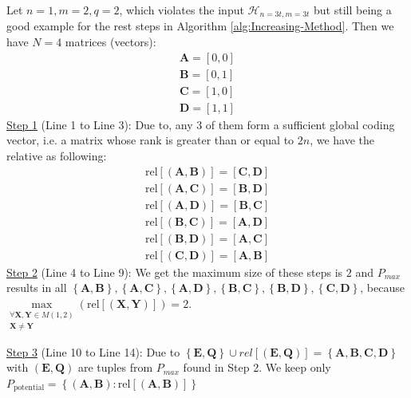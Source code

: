 \begin{example}
Let $n=1,m=2,q=2$, which violates the input $\mathcal{H}_{n=3t,m=3t}$
but still being a good example for the rest steps in Algorithm \ref{alg:Increasing-Method}.
Then we have $N=4$ matrices (vectors):
\[
\begin{array}{c}
\boldsymbol{A}=[0,0]\\
\boldsymbol{B}=[0,1]\\
\boldsymbol{C}=[1,0]\\
\boldsymbol{D}=[1,1]
\end{array}
\]
\uline{Step 1} (Line 1 to Line 3): Due to, any 3 of them form a
sufficient global coding vector, i.e. a matrix whose rank is greater
than or equal to $2n$, we have the relative as following:
\[
\begin{array}{c}
\mathrm{rel}\left[\left(\boldsymbol{A},\boldsymbol{B}\right)\right]=[\boldsymbol{C},\boldsymbol{D}]\\
\mathrm{rel}\left[\left(\boldsymbol{A},\boldsymbol{C}\right)\right]=[\boldsymbol{B},\boldsymbol{D}]\\
\mathrm{rel}\left[\left(\boldsymbol{A},\boldsymbol{D}\right)\right]=[\boldsymbol{B},\boldsymbol{C}]\\
\mathrm{rel}\left[\left(\boldsymbol{B},\boldsymbol{C}\right)\right]=[\boldsymbol{A},\boldsymbol{D}]\\
\mathrm{rel}\left[\left(\boldsymbol{B},\boldsymbol{D}\right)\right]=[\boldsymbol{A},\boldsymbol{C}]\\
\mathrm{rel}\left[\left(\boldsymbol{C},\boldsymbol{D}\right)\right]=[\boldsymbol{A},\boldsymbol{B}]
\end{array}
\]
\uline{Step 2} (Line 4 to Line 9): We get the maximum size of these
steps is $2$ and $P_{max}$ results in all $\left\{ \boldsymbol{A},\boldsymbol{B}\right\} ,\left\{ \boldsymbol{A},\boldsymbol{C}\right\} ,\left\{ \boldsymbol{A},\boldsymbol{D}\right\} ,\left\{ \boldsymbol{B},\boldsymbol{C}\right\} ,\left\{ \boldsymbol{B},\boldsymbol{D}\right\} ,\left\{ \boldsymbol{C},\boldsymbol{D}\right\} $,
because $\underset{\begin{array}{c}
\forall\boldsymbol{X},\boldsymbol{Y}\in M(1,2)\\
\boldsymbol{X}\neq\boldsymbol{Y}
\end{array}}{\mathrm{max}}\left(\mathrm{rel}\left[\left(\boldsymbol{X},\boldsymbol{Y}\right)\right]\right)=2$.

\uline{Step 3} (Line 10 to Line 14): Due to $\left\{ \boldsymbol{E},\boldsymbol{Q}\right\} \cup rel\left[\left(\boldsymbol{E},\boldsymbol{Q}\right)\right]=\left\{ \boldsymbol{A},\boldsymbol{B},\boldsymbol{C},\boldsymbol{D}\right\} $
with $\left(\boldsymbol{E},\boldsymbol{Q}\right)$ are tuples from
$P_{max}$ found in Step 2. We keep only $P_{\mathrm{potential}}=\left\{ \left(\boldsymbol{A},\boldsymbol{B}\right):\mathrm{rel}\left[\left(\boldsymbol{A},\boldsymbol{B}\right)\right]\right\} $


\end{example}
